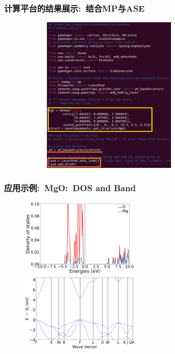 %
\frame
{
	\frametitle{\textrm{计算平台的结果展示:~结合\textrm{MP}与\textrm{ASE}}}
\begin{figure}[h!]
\centering
\vspace*{-0.2in}
\includegraphics[height=3.0in,width=3.5in,viewport=0 0 600 550,clip]{Figures/Atomate-ASE_MgO.png}
\label{Atomate-ASE_app}
\end{figure} 
}

\frame
{
	\frametitle{应用示例:~\textrm{MgO:~DOS and Band}}
\begin{figure}[h!]
\centering
\vspace*{-0.16in}
\includegraphics[height=1.5in,width=2.3in,viewport=0 0 900 600,clip]{Figures/Atomate_MgO-DOS.png}
\vskip 0.5pt
\includegraphics[height=1.5in,width=2.3in,viewport=0 0 900 600,clip]{Figures/Atomate_MgO-Band.png}
\label{Atomate_MgO-DOS}
\end{figure} 
}

